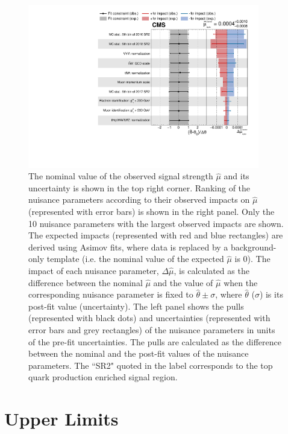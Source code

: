 \begin{figure}[tbh!] 
\begin{center}
\includegraphics[width=0.9\textwidth]{figures/Part3/Results/Impact_VecU}
 \caption{The nominal value of the observed signal strength $\hat{\mu}$ and its uncertainty is shown in the top right corner. Ranking of the nuisance parameters according to their observed impacts on $\hat{\mu}$ (represented with error bars) is shown in the right panel. Only the 10 nuisance parameters with the largest observed impacts are shown. The expected impacts (represented with red and blue rectangles) are derived using Asimov fits, where data is replaced by a background-only template (i.e. the nominal value of the expected $\hat{\mu}$ is 0). The impact of each nuisance parameter, $\Delta\hat{\mu}$, is calculated as the difference between the nominal $\hat{\mu}$ and the value of $\hat{\mu}$ when the corresponding nuisance parameter is fixed to $\hat{\theta}\pm\sigma$, where $\hat{\theta}$ ($\sigma$) is its post-fit value (uncertainty). The left panel shows the pulls (represented with black dots) and uncertainties (represented with error bars and grey rectangles) of the nuisance parameters in units of the pre-fit uncertainties. The pulls are calculated as the difference between the nominal and the post-fit values of the nuisance parameters. The ``SR2" quoted in the label corresponds to the top quark production enriched signal region.}
 \label{fig:Impact}
 \end{center}
\end{figure}

\section{Upper Limits}
\label{sec:Limits}

